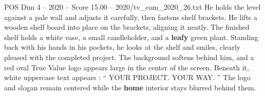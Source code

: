 \begin{textsample}{POS Dim 4 – 2020 – Score 15.00 – 2020/tv\_com\_2020\_26.txt}
He holds the level against a pale wall and adjusts it carefully, then fastens shelf brackets.
He lifts a wooden shelf board into place on the brackets, aligning it neatly.
The finished shelf holds a white vase, a small candleholder, and a \textbf{leafy} green plant.
Standing back with his hands in his pockets, he looks at the shelf and smiles, clearly pleased with the completed project.
The background softens behind him, and a red oval True Value logo appears large in the center of the screen.
Beneath it, white uppercase text appears : “ YOUR PROJECT.
YOUR WAY. ” The logo and slogan remain centered while the \textbf{home} interior stays blurred behind them.

\end{textsample}
